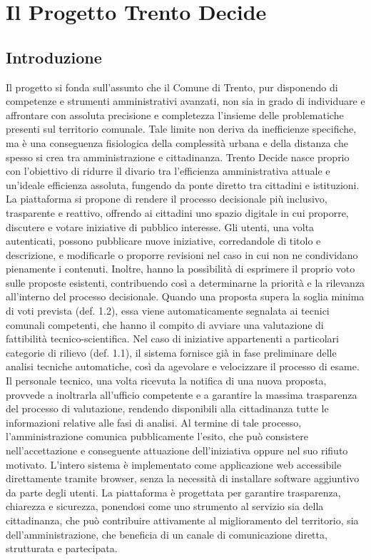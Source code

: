\chapter{Il Progetto Trento Decide}

\section{Introduzione}

Il progetto si fonda sull’assunto che il Comune di Trento, pur disponendo di competenze e strumenti amministrativi avanzati, non sia in grado di individuare e affrontare con assoluta precisione e completezza l’insieme delle problematiche presenti sul territorio comunale. Tale limite non deriva da inefficienze specifiche, ma è una conseguenza fisiologica della complessità urbana e della distanza che spesso si crea tra amministrazione e cittadinanza.
Trento Decide nasce proprio con l’obiettivo di ridurre il divario tra l’efficienza amministrativa attuale e un’ideale efficienza assoluta, fungendo da ponte diretto tra cittadini e istituzioni. La piattaforma si propone di rendere il processo decisionale più inclusivo, trasparente e reattivo, offrendo ai cittadini uno spazio digitale in cui proporre, discutere e votare iniziative di pubblico interesse.
Gli utenti, una volta autenticati, possono pubblicare nuove iniziative, corredandole di titolo e descrizione, e modificarle o proporre revisioni nel caso in cui non ne condividano pienamente i contenuti. Inoltre, hanno la possibilità di esprimere il proprio voto sulle proposte esistenti, contribuendo così a determinarne la priorità e la rilevanza all’interno del processo decisionale.
Quando una proposta supera la soglia minima di voti prevista (def. 1.2), essa viene automaticamente segnalata ai tecnici comunali competenti, che hanno il compito di avviare una valutazione di fattibilità tecnico-scientifica. Nel caso di iniziative appartenenti a particolari categorie di rilievo (def. 1.1), il sistema fornisce già in fase preliminare delle analisi tecniche automatiche, così da agevolare e velocizzare il processo di esame.
Il personale tecnico, una volta ricevuta la notifica di una nuova proposta, provvede a inoltrarla all’ufficio competente e a garantire la massima trasparenza del processo di valutazione, rendendo disponibili alla cittadinanza tutte le informazioni relative alle fasi di analisi. Al termine di tale processo, l’amministrazione comunica pubblicamente l’esito, che può consistere nell’accettazione e conseguente attuazione dell’iniziativa oppure nel suo rifiuto motivato.
L’intero sistema è implementato come applicazione web accessibile direttamente tramite browser, senza la necessità di installare software aggiuntivo da parte degli utenti. La piattaforma è progettata per garantire trasparenza, chiarezza e sicurezza, ponendosi come uno strumento al servizio sia della cittadinanza, che può contribuire attivamente al miglioramento del territorio, sia dell’amministrazione, che beneficia di un canale di comunicazione diretta, strutturata e partecipata.

